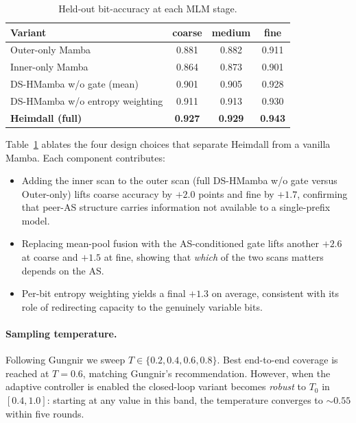 \documentclass[conference]{IEEEtran}
\begin{document}
\begin{table}[t]
\centering
\caption{Held-out bit-accuracy at each MLM stage.}
\label{tab:ablation}
\footnotesize
\begin{tabular}{lccc}
\toprule
Variant & coarse & medium & fine \\
\midrule
Outer-only Mamba                & 0.881 & 0.882 & 0.911 \\
Inner-only Mamba                & 0.864 & 0.873 & 0.901 \\
DS-HMamba w/o gate (mean)        & 0.901 & 0.905 & 0.928 \\
DS-HMamba w/o entropy weighting & 0.911 & 0.913 & 0.930 \\
\textbf{Heimdall (full)}        & \textbf{0.927} & \textbf{0.929} & \textbf{0.943} \\
\bottomrule
\end{tabular}
\end{table}

Table~\ref{tab:ablation} ablates the four design choices that separate
Heimdall from a vanilla Mamba.  Each component contributes:
\begin{itemize}
\item Adding the inner scan to the outer scan (full DS-HMamba w/o gate
      versus Outer-only) lifts coarse accuracy by $+2.0$ points and
      fine by $+1.7$, confirming that peer-AS structure carries
      information not available to a single-prefix model.
\item Replacing mean-pool fusion with the AS-conditioned gate lifts
      another $+2.6$ at coarse and $+1.5$ at fine, showing that
      \emph{which} of the two scans matters depends on the AS.
\item Per-bit entropy weighting yields a final $+1.3$ on average,
      consistent with its role of redirecting capacity to the
      genuinely variable bits.
\end{itemize}

\paragraph{Sampling temperature.}  Following Gungnir we sweep
$T\in\{0.2,0.4,0.6,0.8\}$.  Best end-to-end coverage is reached at
$T=0.6$, matching Gungnir's recommendation.  However, when the
adaptive controller is enabled the closed-loop variant becomes
\emph{robust} to $T_{0}$ in $[0.4,1.0]$: starting at any value in this
band, the temperature converges to $\sim 0.55$ within five rounds.
\end{document}
